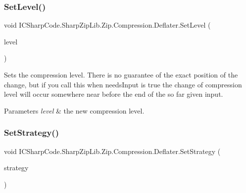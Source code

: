 \subsubsection{\texorpdfstring{Set\+Level()}{SetLevel()}\hspace{0.1cm}{\footnotesize\ttfamily [2/2]}}
{\footnotesize\ttfamily void I\+C\+Sharp\+Code.\+Sharp\+Zip\+Lib.\+Zip.\+Compression.\+Deflater.\+Set\+Level (\begin{DoxyParamCaption}\item[{int}]{level }\end{DoxyParamCaption})\hspace{0.3cm}{\ttfamily [inline]}}



Sets the compression level. There is no guarantee of the exact position of the change, but if you call this when needs\+Input is true the change of compression level will occur somewhere near before the end of the so far given input. 


\begin{DoxyParams}{Parameters}
{\em level} & the new compression level. \\
\hline
\end{DoxyParams}
\mbox{\label{class_i_c_sharp_code_1_1_sharp_zip_lib_1_1_zip_1_1_compression_1_1_deflater_a1d3cf927ab2a1e6c6a477d9e2d2a1e93}} 
\subsubsection{\texorpdfstring{Set\+Strategy()}{SetStrategy()}\hspace{0.1cm}{\footnotesize\ttfamily [1/2]}}
{\footnotesize\ttfamily void I\+C\+Sharp\+Code.\+Sharp\+Zip\+Lib.\+Zip.\+Compression.\+Deflater.\+Set\+Strategy (\begin{DoxyParamCaption}\item[{\hyperlink{namespace_i_c_sharp_code_1_1_sharp_zip_lib_1_1_zip_1_1_compression_a922c175879503e6b9e35641deccfbc40}{Deflate\+Strategy}}]{strategy }\end{DoxyParamCaption})\hspace{0.3cm}{\ttfamily [inline]}}



